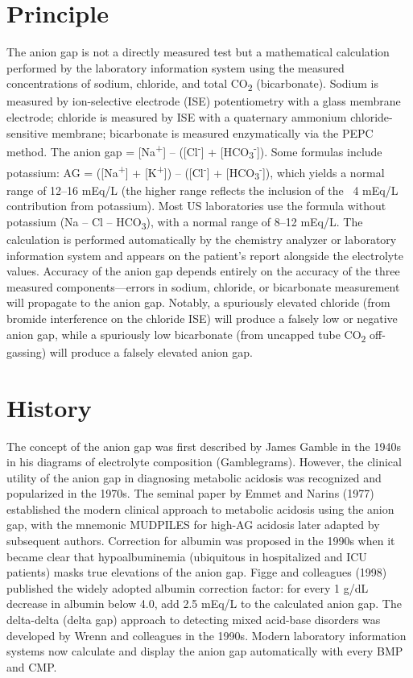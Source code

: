 \section*{Principle}
The anion gap is not a directly measured test but a mathematical calculation performed by the laboratory information system using the measured concentrations of sodium, chloride, and total CO\textsubscript{2} (bicarbonate). Sodium is measured by ion-selective electrode (ISE) potentiometry with a glass membrane electrode; chloride is measured by ISE with a quaternary ammonium chloride-sensitive membrane; bicarbonate is measured enzymatically via the PEPC method. The anion gap = [Na\textsuperscript{+}] -- ([Cl\textsuperscript{-}] + [HCO\textsubscript{3}\textsuperscript{-}]). Some formulas include potassium: AG = ([Na\textsuperscript{+}] + [K\textsuperscript{+}]) -- ([Cl\textsuperscript{-}] + [HCO\textsubscript{3}\textsuperscript{-}]), which yields a normal range of 12--16 mEq/L (the higher range reflects the inclusion of the ~4 mEq/L contribution from potassium). Most US laboratories use the formula without potassium (Na -- Cl -- HCO\textsubscript{3}), with a normal range of 8--12 mEq/L. The calculation is performed automatically by the chemistry analyzer or laboratory information system and appears on the patient's report alongside the electrolyte values. Accuracy of the anion gap depends entirely on the accuracy of the three measured components---errors in sodium, chloride, or bicarbonate measurement will propagate to the anion gap. Notably, a spuriously elevated chloride (from bromide interference on the chloride ISE) will produce a falsely low or negative anion gap, while a spuriously low bicarbonate (from uncapped tube CO\textsubscript{2} off-gassing) will produce a falsely elevated anion gap.

\section*{History}
The concept of the anion gap was first described by James Gamble in the 1940s in his diagrams of electrolyte composition (Gamblegrams). However, the clinical utility of the anion gap in diagnosing metabolic acidosis was recognized and popularized in the 1970s. The seminal paper by Emmet and Narins (1977) established the modern clinical approach to metabolic acidosis using the anion gap, with the mnemonic MUDPILES for high-AG acidosis later adapted by subsequent authors. Correction for albumin was proposed in the 1990s when it became clear that hypoalbuminemia (ubiquitous in hospitalized and ICU patients) masks true elevations of the anion gap. Figge and colleagues (1998) published the widely adopted albumin correction factor: for every 1 g/dL decrease in albumin below 4.0, add 2.5 mEq/L to the calculated anion gap. The delta-delta (delta gap) approach to detecting mixed acid-base disorders was developed by Wrenn and colleagues in the 1990s. Modern laboratory information systems now calculate and display the anion gap automatically with every BMP and CMP.

